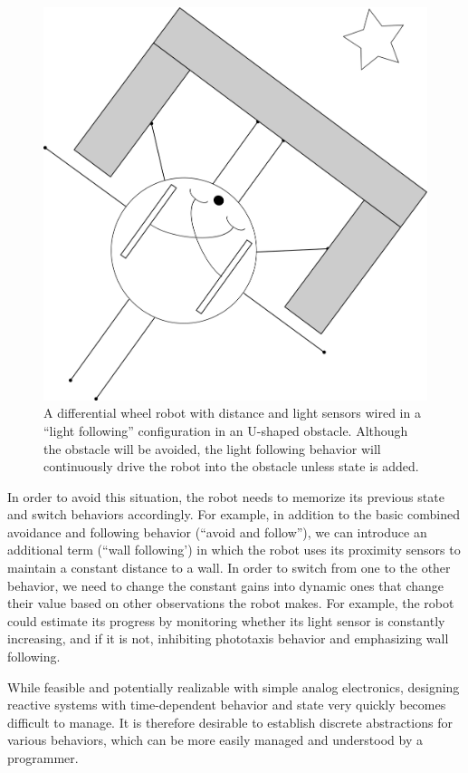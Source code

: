 \begin{figure}
\centering
\includegraphics[width=0.8\columnwidth]{figs/uobstacle.png}
\caption{\label{fig:uobstacle}A differential wheel robot with distance and light sensors wired in a ``light following'' configuration in an U-shaped obstacle. Although the obstacle will be avoided, the light following behavior will continuously drive the robot into the obstacle unless state is added.}
\end{figure}


In order to avoid this situation, the robot needs to memorize its previous state and switch behaviors accordingly. For example, in addition to the basic combined avoidance and following behavior (``avoid and follow''), we can introduce an additional term (``wall following') in which the robot uses its proximity sensors to maintain a constant distance to a wall. In order to switch from one to the other behavior, we need to change the constant gains into dynamic ones that change their value based on other observations the robot makes. For example, the robot could estimate its progress by monitoring whether its light sensor is constantly increasing, and if it is not, inhibiting phototaxis behavior and emphasizing wall following. 

While feasible and potentially realizable with simple analog electronics, designing reactive systems with time-dependent behavior and state very quickly becomes difficult to manage. It is therefore desirable to establish discrete abstractions for various behaviors, which can be more easily managed and understood by a programmer. 
%
%
